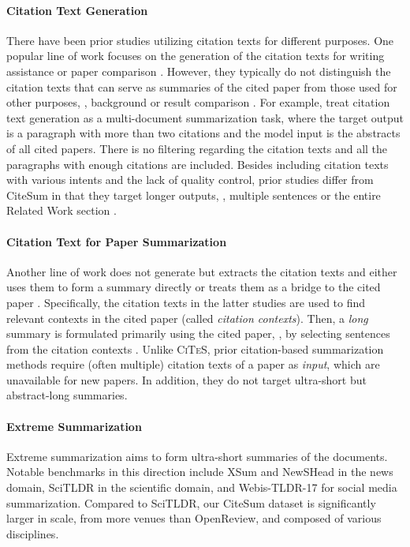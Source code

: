 \documentclass[11pt]{article}
\newcommand{\ours}{\textsc{CiTeS}\xspace}
\newcommand{\ourdata}{CiteSum\xspace}
\begin{document}
\paragraph{Citation Text Generation}
There have been prior studies utilizing citation texts for different purposes.
One popular line of work focuses on the generation of the citation texts for writing assistance or paper comparison \cite{xing-etal-2020-automatic,luu-etal-2021-explaining,chen-etal-2021-capturing,ge-etal-2021-baco}.
However, they typically do not distinguish the citation texts that can serve as summaries of the cited paper from those used for other purposes, \eg, background or result comparison \cite{cohan-etal-2019-structural}.
For example, \citet{chen-etal-2021-capturing} treat citation text generation as a multi-document summarization task, where the target output is a paragraph with more than two citations and the model input is the abstracts of all cited papers.
There is no filtering regarding the citation texts and all the paragraphs with enough citations are included.
Besides including citation texts with various intents and the lack of quality control, prior studies differ from \ourdata in that they target longer outputs, \eg, multiple sentences \cite{xing-etal-2020-automatic} or the entire Related Work section \cite{lu-etal-2020-multi-xscience,chen-etal-2021-capturing}.


\paragraph{Citation Text for Paper Summarization}
Another line of work does not generate but extracts the citation texts and either uses them to form a summary directly \cite{nakov2004citances,abu-jbara-radev-2011-coherent,qazvinian2013generating} or treats them as a bridge to the cited paper \cite{cohan-goharian-2015-scientific,yasunaga2019scisummnet}.
Specifically, the citation texts in the latter studies are used to find relevant contexts in the cited paper (called \textit{citation contexts}).
Then, a \textit{long} summary is formulated primarily using the cited paper, \eg, by selecting sentences from the citation contexts \cite{cohan-goharian-2015-scientific}.
Unlike \ours, prior citation-based summarization methods require (often multiple) citation texts of a paper as \textit{input}, which are unavailable for new papers. In addition, they do not target ultra-short but abstract-long summaries.


\paragraph{Extreme Summarization}
Extreme summarization aims to form ultra-short summaries of the documents.
Notable benchmarks in this direction include XSum \cite{narayan-etal-2018-dont} and NewSHead \cite{headline2020} in the news domain, SciTLDR \cite{cachola-etal-2020-tldr} in the scientific domain, and Webis-TLDR-17 \cite{volske-etal-2017-tl} for social media summarization.
Compared to SciTLDR, our \ourdata dataset is significantly larger in scale, from more venues than OpenReview, and composed of various disciplines.
\end{document}
